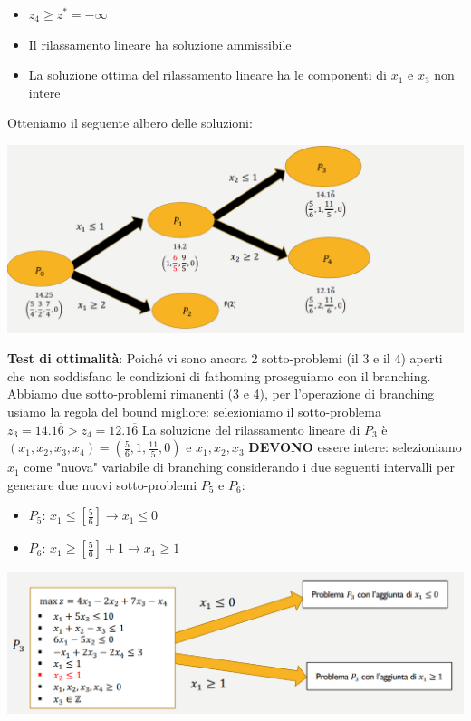 \documentclass[12pt]{article}
\begin{document}
\begin{itemize}
    \item $z_4 \geq z^*=-\infty$
    \item Il rilassamento lineare ha soluzione ammissibile
    \item La soluzione ottima del rilassamento lineare ha le componenti di $x_1$ e $x_3$ non intere
\end{itemize}
Otteniamo il seguente albero delle soluzioni:
\begin{center}
    \includegraphics[width = 0.90\linewidth]{Images/79.png}
\end{center}
\textbf{Test di ottimalità}: Poiché vi sono ancora 2 sotto-problemi (il 3 e il 4) aperti che non soddisfano le condizioni di fathoming proseguiamo con il branching.
Abbiamo due sotto-problemi rimanenti (3 e 4), per l'operazione di branching usiamo la regola del bound migliore: selezioniamo il sotto-problema $z_3 = 14.1\overline{6} > z_4 = 12.1\overline{6}$
La soluzione del rilassamento lineare di $P_3$ è $(x_1,x_2,x_3,x_4) = (\frac{5}{6}, 1, \frac{11}{5}, 0)$ e $x_1,x_2,x_3$ \textbf{DEVONO} essere intere:
selezioniamo $x_1$ come "nuova" variabile di branching considerando i due seguenti intervalli per generare due nuovi sotto-problemi $P_5$ e $P_6$:
\begin{itemize}
    \item $P_5$: $x_1 \leq \left [\frac{5}{6} \right ] \rightarrow x_1 \leq 0$
    \item $P_6$: $x_1 \geq \left [\frac{5}{6} \right ] + 1 \rightarrow x_1 \geq 1$
\end{itemize}
\begin{center}
    \includegraphics[width = 0.90\linewidth]{Images/80.png}
\end{center}
\end{document}
